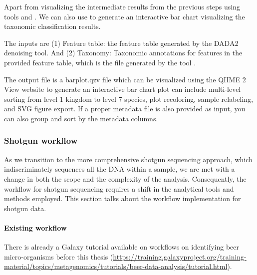             Apart from visualizing the intermediate results from the previous steps using tools  and . We can also use  to generate an interactive bar chart visualizing the taxonomic classification results. 

                The inputs are (1) Feature table: the feature table generated by the DADA2 denoising tool. And (2) Taxonomy: Taxonomic annotations for features in the provided feature table, which is the file generated by the tool .

                The output file is a barplot.qzv file which can be visualized using the QIIME 2 View website to generate an interactive bar chart plot can include multi-level sorting from level 1 kingdom to level 7 species, plot recoloring, sample relabeling, and SVG figure export. If a proper metadata file is also provided as input, you can also group and sort by the metadata columns. 

        
        \subsubsection*{Shotgun workflow}
        
            As we transition to the more comprehensive shotgun sequencing approach, which indiscriminately sequences all the DNA within a sample, we are met with a change in both the scope and the complexity of the analysis. Consequently, the workflow for shotgun sequencing requires a shift in the analytical tools and methods employed. This section talks about the workflow implementation for shotgun data.
            
        \paragraph*{Existing workflow}

            There is already a Galaxy tutorial available on workflows on identifying beer micro-organisms before this thesis (\url{https://training.galaxyproject.org/training-material/topics/metagenomics/tutorials/beer-data-analysis/tutorial.html}).
                        
